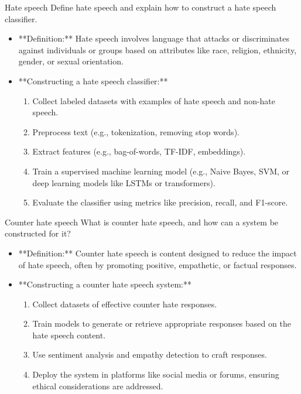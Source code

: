 \documentclass{article}
\begin{document}
\begin{exercise}{Hate speech}
  Define hate speech and explain how to construct a hate speech classifier.

  \begin{solution}
    \begin{itemize}
        \item **Definition:** Hate speech involves language that attacks or discriminates against individuals or groups based on attributes like race, religion, ethnicity, gender, or sexual orientation.
        \item **Constructing a hate speech classifier:**
        \begin{enumerate}
            \item Collect labeled datasets with examples of hate speech and non-hate speech.
            \item Preprocess text (e.g., tokenization, removing stop words).
            \item Extract features (e.g., bag-of-words, TF-IDF, embeddings).
            \item Train a supervised machine learning model (e.g., Naive Bayes, SVM, or deep learning models like LSTMs or transformers).
            \item Evaluate the classifier using metrics like precision, recall, and F1-score.
        \end{enumerate}
    \end{itemize}
  \end{solution}
\end{exercise}

\begin{exercise}{Counter hate speech}
  What is counter hate speech, and how can a system be constructed for it?

  \begin{solution}
    \begin{itemize}
        \item **Definition:** Counter hate speech is content designed to reduce the impact of hate speech, often by promoting positive, empathetic, or factual responses.
        \item **Constructing a counter hate speech system:**
        \begin{enumerate}
            \item Collect datasets of effective counter hate responses.
            \item Train models to generate or retrieve appropriate responses based on the hate speech content.
            \item Use sentiment analysis and empathy detection to craft responses.
            \item Deploy the system in platforms like social media or forums, ensuring ethical considerations are addressed.
        \end{enumerate}
    \end{itemize}
  \end{solution}
\end{exercise}
\end{document}
